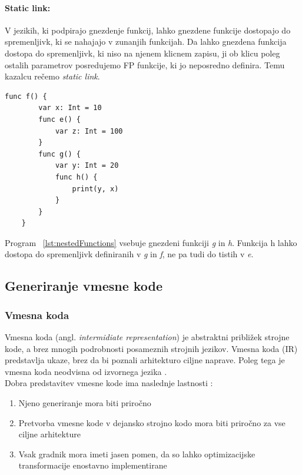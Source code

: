 \documentclass[a4paper, 12p]{book}
\begin{document}
\paragraph{Static link:}

V jezikih, ki podpirajo gnezdenje funkcij, lahko gnezdene funkcije dostopajo do spremenljivk, ki se nahajajo v zunanjih funkcijah. Da lahko gnezdena funkcija dostopa do spremenljivk, ki niso na njenem klicnem zapisu, ji ob klicu poleg ostalih parametrov posredujemo FP funkcije, ki jo neposredno definira. Temu kazalcu rečemo \textit{static link}. 

\renewcommand{\lstlistingname}{Program}
\begin{lstlisting}[caption={Primer gnezdenih funkcij.}, captionpos=b, label={lst:nestedFunctions}]
    func f() {
        var x: Int = 10
        func e() {
            var z: Int = 100
        }
        func g() {
            var y: Int = 20
            func h() {
                print(y, x)
            }
        }
    }
\end{lstlisting}

Program ~\ref{lst:nestedFunctions} vsebuje gnezdeni funkciji \textit{g} in \textit{h}. Funkcija h lahko dostopa do spremenljivk definiranih v \textit{g} in \textit{f}, ne pa tudi do tistih v \textit{e}.

\subsection{Generiranje vmesne kode}   

\subsubsection{Vmesna koda}

Vmesna koda (angl. \textit{intermidiate representation}) je abstraktni približek strojne kode, a brez mnogih podrobnosti posameznih strojnih jezikov. Vmesna koda (IR) predstavlja ukaze, brez da bi poznali arhitekturo ciljne naprave. Poleg tega je vmesna koda neodvisna od izvornega jezika \cite{modernCompiler}. \\
\indent Dobra predstavitev vmesne kode ima naslednje lastnosti \cite{modernCompiler}:

\begin{enumerate}
	\item Njeno generiranje mora biti priročno
	\item Pretvorba vmesne kode v dejansko strojno kodo mora biti priročno za vse ciljne arhitekture
	\item Vsak gradnik mora imeti jasen pomen, da so lahko optimizacijske transformacije enostavno implementirane
\end{enumerate}
\end{document}
